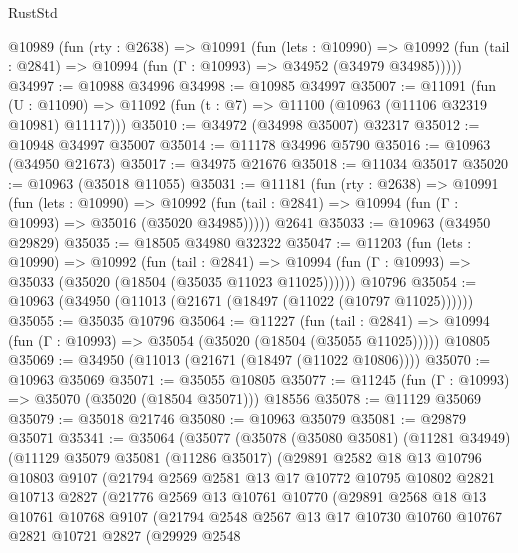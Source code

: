 \begin{lexlean}{RustStd}
\begin{coremodule}
  @10989
    (fun (rty : @2638) =>
    @10991
      (fun (lets : @10990) =>
      @10992 (fun (tail : @2841) => @10994 (fun (Γ : @10993) => @34952 (@34979 @34985)))))
@34997 := @10988 @34996
@34998 := @10985 @34997
@35007 := @11091
    (fun (U : @11090) => @11092 (fun (t : @7) => @11100 (@10963 (@11106 @32319 @10981) @11117)))
@35010 := @34972 (@34998 @35007) @32317
@35012 := @10948 @34997 @35007
@35014 := @11178 @34996 @5790
@35016 := @10963 (@34950 @21673)
@35017 := @34975 @21676
@35018 := @11034 @35017
@35020 := @10963 (@35018 @11055)
@35031 := @11181
    (fun (rty : @2638) =>
    @10991
      (fun (lets : @10990) =>
      @10992 (fun (tail : @2841) => @10994 (fun (Γ : @10993) => @35016 (@35020 @34985)))))
    @2641
@35033 := @10963 (@34950 @29829)
@35035 := @18505 @34980 @32322
@35047 := @11203
    (fun (lets : @10990) =>
    @10992
      (fun (tail : @2841) =>
      @10994 (fun (Γ : @10993) => @35033 (@35020 (@18504 (@35035 @11023 @11025))))))
    @10796
@35054 := @10963 (@34950 (@11013 (@21671 (@18497 (@11022 (@10797 @11025))))))
@35055 := @35035 @10796
@35064 := @11227
    (fun (tail : @2841) => @10994 (fun (Γ : @10993) => @35054 (@35020 (@18504 (@35055 @11025)))))
    @10805
@35069 := @34950 (@11013 (@21671 (@18497 (@11022 @10806))))
@35070 := @10963 @35069
@35071 := @35055 @10805
@35077 := @11245 (fun (Γ : @10993) => @35070 (@35020 (@18504 @35071))) @18556
@35078 := @11129 @35069
@35079 := @35018 @21746
@35080 := @10963 @35079
@35081 := @29879 @35071
@35341 := @35064
    (@35077
      (@35078
        (@35080 @35081)
        (@11281 @34949)
        (@11129
          @35079
          @35081
          (@11286 @35017)
          (@29891
            @2582
            @18
            @13
            @10796
            @10803
            @9107
            (@21794
              @2569
              @2581
              @13
              @17
              @10772
              @10795
              @10802
              @2821
              @10713
              @2827
              (@21776
                @2569
                @13
                @10761
                @10770
                (@29891
                  @2568
                  @18
                  @13
                  @10761
                  @10768
                  @9107
                  (@21794
                    @2548
                    @2567
                    @13
                    @17
                    @10730
                    @10760
                    @10767
                    @2821
                    @10721
                    @2827
                    (@29929
                      @2548

\end{coremodule}
\end{lexlean}
